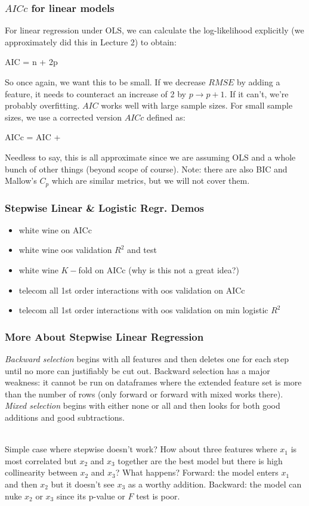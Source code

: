 \documentclass[handout]{beamer}
\begin{document}
\begin{frame}\frametitle{$AICc$ for linear models}
\small
For linear regression under OLS, we can calculate the log-likelihood explicitly (we approximately did this in Lecture 2) to obtain:

\beqn
AIC = n + 2p
\eeqn

\pause So once again, we want this to be small. If we decrease $RMSE$ by adding a feature, it needs to counteract an increase of 2 by $p \rightarrow p+1$. If it can't, we're probably overfitting. \pause $AIC$ works well with large sample sizes. For small sample sizes, we use a corrected version $AICc$ defined as:

\beqn
AICc = AIC + 
\eeqn

Needless to say, this is all approximate since we are assuming OLS and a whole bunch of other things (beyond scope of course). \pause Note: there are also BIC and Mallow's $C_p$ which are similar metrics, but we will not cover them. 


	
\end{frame}

\begin{frame}\frametitle{Stepwise Linear \& Logistic Regr. Demos}

\begin{itemize}
\item white wine on AICc \pause
\item white wine oos validation $R^2$ and test \pause
\item white wine $K-$fold on AICc (why is this not a great idea?)
\item telecom all 1st order interactions with oos validation on AICc
\item telecom all 1st order interactions with oos validation on min logistic $R^2$
\end{itemize}


\end{frame}

\begin{frame}\frametitle{More About Stepwise Linear Regression}

\small
\emph{Backward selection} begins with all features and then deletes one for each step until no more can justifiably be cut out. \pause Backward selection has a major weakness: it cannot be run on dataframes where the extended feature set is more than the number of rows (only forward or forward with mixed works there). \pause \emph{Mixed selection} begins with either none or all and then looks for both good additions and good subtractions. \\~\\ \pause

Simple case where stepwise doesn't work? \pause How about three features where $x_1$ is most correlated but $x_2$ and $x_3$ together are the best model but there is high collinearity between $x_2$ and $x_3$? What happens? \pause Forward: the model enters $x_1$ and then $x_2$ but it doesn't see $x_3$ as a worthy addition. Backward: the model can nuke $x_2$ or $x_3$ since its p-value or $F$ test is poor.
\end{frame}
\end{document}
